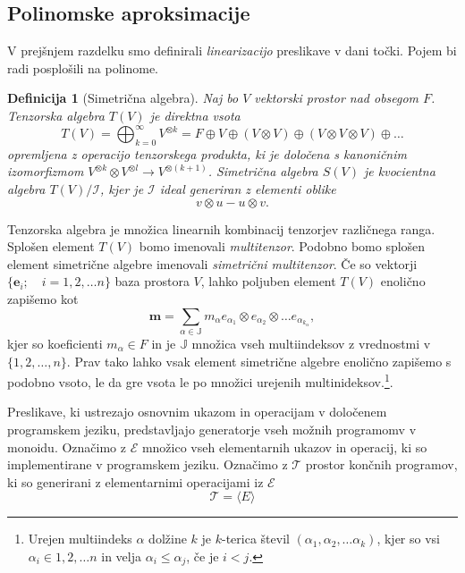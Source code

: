 \documentclass{article}
\newcommand{\JJ}{\mathbb{J}}
\newcommand{\E}{\mathcal{E}}
\newcommand{\T}{\mathcal{T}}
\newcommand{\e}{\mathbf{e}}
\newcommand{\m}{\mathbf{m}}
\newtheorem{definicija}{Definicija}[section]
\begin{document}
\subsection{Polinomske aproksimacije}
V prejšnjem razdelku smo definirali \emph{linearizacijo} preslikave v dani
točki. Pojem bi radi posplošili na polinome. 
\begin{definicija}[Simetrična algebra]
  Naj bo $V$ vektorski prostor nad obsegom $F$. \emph{Tenzorska algebra} $T(V)$ je direktna vsota
  \begin{equation}
    \label{eq:tenzorska_algebra}
    T(V)=\bigoplus_{k=0}^\infty V^{\otimes k}=F\oplus V\oplus (V\otimes V)\oplus (V\otimes V\otimes V)\oplus\ldots
  \end{equation}
opremljena z operacijo tenzorskega produkta, ki je določena s kanoničnim
izomorfizmom $V^{\otimes k}\otimes V^{\otimes l}\to V^{\otimes (k+1)}$. 
\emph{Simetrična algebra} $S(V)$ je kvocientna algebra $T(V)/\mathcal{I}$, kjer
je $\mathcal{I}$ ideal generiran z elementi oblike
\begin{equation}
  \label{eq:simetricna_algebra}
  v\otimes u -u\otimes v.
\end{equation}
\end{definicija}
Tenzorska algebra je množica linearnih kombinacij tenzorjev različnega ranga.
Splošen element $T(V)$ bomo imenovali
\emph{multitenzor}. Podobno bomo splošen element simetrične algebre imenovali
\emph{simetrični multitenzor}.
Če so vektorji  $\{\e_i;\quad i=1,2,\ldots n\}$ baza prostora $V$, lahko poljuben
element $T(V)$ enolično zapišemo kot
\begin{equation}
  \label{eq:multitenzor}
  \m = \sum_{\alpha\in \JJ}m_\alpha e_{\alpha_1}\otimes e_{\alpha_2}\otimes\ldots e_{\alpha_{k_\alpha}},
\end{equation}
kjer so koeficienti $m_\alpha\in F$ in je $\JJ$ množica vseh multiindeksov z
vrednostmi v $\{1,2,\ldots,n\}$. Prav tako lahko vsak element simetrične algebre
enolično zapišemo s podobno vsoto, le da gre vsota le po množici urejenih multinideksov.\footnote{Urejen multiindeks $\alpha$ dolžine $k$ je $k$-terica
števil $(\alpha_1,\alpha_2, \ldots \alpha_k)$, kjer so vsi
$\alpha_i\in{1,2,\ldots n}$ in velja $\alpha_i\le\alpha_j$, če je $i<j$.}.
 
Preslikave, ki ustrezajo osnovnim ukazom in operacijam v določenem
programskem jeziku, predstavljajo generatorje vseh možnih programomv v
monoidu. Označimo z $\E$ množico vseh elementarnih ukazov in operacij, ki so
implementirane v programskem jeziku. Označimo z $\T$ prostor končnih programov,
ki so generirani z elementarnimi operacijami iz $\E$
\begin{equation*}
  \T=\langle E \rangle
\end{equation*}
\end{document}

